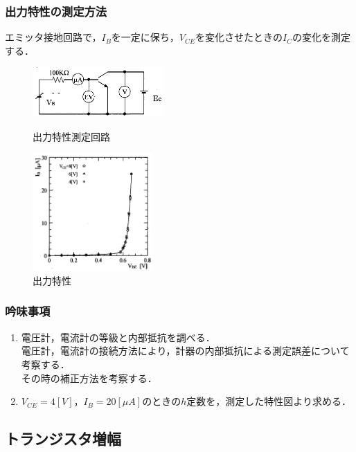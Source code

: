 \documentclass[10pt, a4j, dvipdfmx]{jarticle}
\begin{document}
    \subsubsection{出力特性の測定方法}
    エミッタ接地回路で，$I_B$を一定に保ち，$V_{CE}$を変化させたときの$I_C$の変化を測定する．
    \begin{figure}[H]
        \begin{minipage}{0.5\hsize}
            \centering
            \includegraphics[width=50mm]{fig-1.png}
            \caption{出力特性測定回路}
            \label{fig:3}
        \end{minipage}
        \begin{minipage}{0.5\hsize}
            \centering
            \includegraphics[height=45mm]{fig-2.png}
            \caption{出力特性}
            \label{fig:4}
        \end{minipage}
    \end{figure}
    \subsubsection{吟味事項}
    \begin{enumerate}
        \item 電圧計，電流計の等級と内部抵抗を調べる．\\電圧計，電流計の接続方法により，計器の内部抵抗による測定誤差について考察する．\\その時の補正方法を考察する．
        \item $V_{CE} = 4[V]$，$I_B = 20[\mu A]$のときの$h$定数を，測定した特性図より求める．
    \end{enumerate}

    \newpage
    \subsection{トランジスタ増幅}
\end{document}
